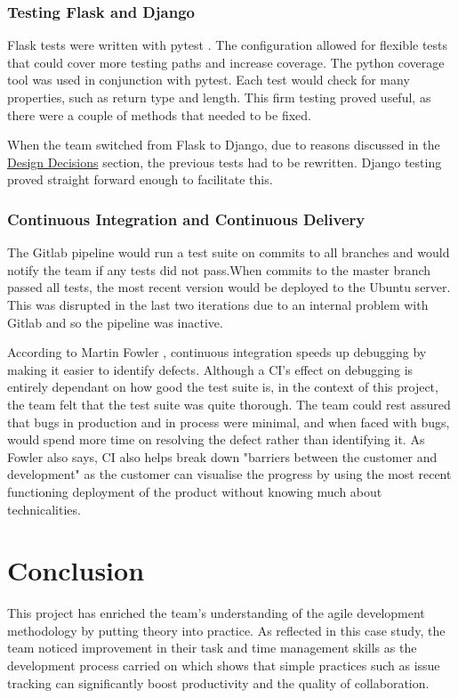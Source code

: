 \documentclass{l3proj}
\begin{document}
\subsubsection{Testing Flask and Django}
\label{subsubsec:testpython}
Flask tests were written with pytest \cite{PYTEST}. The configuration allowed for flexible tests that could cover more testing paths and increase coverage. The python coverage tool \cite{COVERAGE} was used in conjunction with pytest. Each test would check for many properties, such as return type and length. This firm testing proved useful, as there were a couple of methods that needed to be fixed.

When the team switched from Flask to Django, due to reasons discussed in the \hyperref[subsec:designdecisions]{Design Decisions} section, the previous tests had to be rewritten. Django testing proved straight forward enough to facilitate this.


\subsubsection{Continuous Integration and Continuous Delivery}
\label{subsubsec:cicd}
The Gitlab pipeline would run a test suite on commits to all branches and would notify the team if any tests did not pass.When commits to the master branch passed all tests, the most recent version would be deployed to the Ubuntu server. This was disrupted in the last two iterations due to an internal problem with Gitlab and so the pipeline was inactive.

According to Martin Fowler \cite{CI}, continuous integration speeds up debugging by making it easier to identify defects. Although a CI's effect on debugging is entirely dependant on how good the test suite is, in the context of this project, the team felt that the test suite was quite thorough. The team could rest assured that bugs in production and in process were minimal, and when faced with bugs, would spend more time on resolving the defect rather than identifying it. As Fowler also says, CI also helps break down "barriers between the customer and development" \cite{CI} as the customer can visualise the progress by using the most recent functioning deployment of the product without knowing much about technicalities.


\section{Conclusion}
\label{sec:conclusion}
This project has enriched the team's understanding of the agile development methodology by putting theory into practice. As reflected in this case study, the team noticed improvement in their task and time management skills as the development process carried on which shows that simple practices such as issue tracking can significantly boost productivity and the quality of collaboration. 
\end{document}
